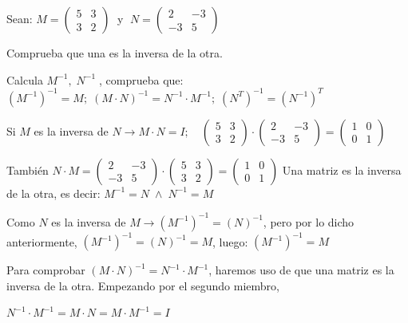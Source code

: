 \begin{ejre}
	Sean: $M=\left( \begin{matrix} 5&3\\3&2 \end{matrix} \right)\; $ y $\; N=\left( \begin{matrix} 2&-3\\-3&5 \end{matrix} \right)\; $
	
	Comprueba que una es la inversa de la otra.
	
	Calcula $M^{-1}, \; N^{-1}\;$, comprueba que:  $(M^{-1})^{-1}=M; \; (M\cdot N)^{-1}=N^{-1}\cdot M^{-1}; \; (N^T)^{-1}=(N^{-1})^T$
\end{ejre}
\begin{proofw}\renewcommand{\qedsymbol}{$\diamond$}

Si $M$ es la inversa de $N\to M\cdot N=I; \quad \left( \begin{matrix} 5&3\\3&2 \end{matrix} \right)\cdot \left( \begin{matrix} 2&-3\\-3&5 \end{matrix} \right)= \left( \begin{matrix} 1&0\\0&1 \end{matrix} \right)$

\noindent También $N\cdot M = \left( \begin{matrix} 2&-3\\-3&5 \end{matrix} \right) \cdot \left( \begin{matrix} 5&3\\3&2 \end{matrix} \right) = \left( \begin{matrix} 1&0\\0&1 \end{matrix} \right)$ Una matriz es la inversa de la otra, es decir: $M^{-1}=N\; \wedge \; N^{-1}=M$

\noindent Como $N$ es la inversa de $M \to (M^{-1})^{-1}=(N)^{-1}$, pero por lo dicho anteriormente, $(M^{-1})^{-1}=(N)^{-1}=M$, luego: $(M^{-1})^{-1}=M$

\noindent Para comprobar $(M\cdot N)^{-1}=N^{-1}\cdot M^{-1}$, haremos uso de que una matriz es la inversa de la otra. Empezando por el segundo miembro,

$N^{-1}\cdot M^{-1}=M\cdot N= M\cdot M^{-1}=I$


\end{proofw}
